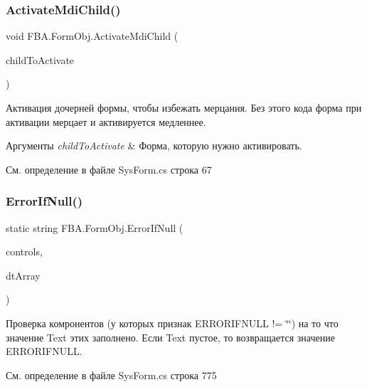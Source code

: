 \subsubsection{\texorpdfstring{Activate\+Mdi\+Child()}{ActivateMdiChild()}}
{\footnotesize\ttfamily void F\+B\+A.\+Form\+Obj.\+Activate\+Mdi\+Child (\begin{DoxyParamCaption}\item[{\mbox{\hyperlink{class_f_b_a_1_1_form_obj}{Form\+Obj}}}]{child\+To\+Activate }\end{DoxyParamCaption})}



Активация дочерней формы, чтобы избежать мерцания. Без этого кода форма при активации мерцает и активируется медленнее. 


\begin{DoxyParams}{Аргументы}
{\em child\+To\+Activate} & Форма, которую нужно активировать.\\
\hline
\end{DoxyParams}


См. определение в файле Sys\+Form.\+cs строка 67

\mbox{\label{class_f_b_a_1_1_form_obj_a206880e9e37a593cb85a5b2053320056}} 
\subsubsection{\texorpdfstring{Error\+If\+Null()}{ErrorIfNull()}}
{\footnotesize\ttfamily static string F\+B\+A.\+Form\+Obj.\+Error\+If\+Null (\begin{DoxyParamCaption}\item[{Control.\+Control\+Collection}]{controls,  }\item[{out \mbox{\hyperlink{_sys_static_8cs_a6542cfcff2f8e81f06ade15aa0bfe2b7}{System.\+Data.\+Data\+Table}}}]{dt\+Array }\end{DoxyParamCaption})\hspace{0.3cm}{\ttfamily [static]}}

Проверка комронентов (у которых признак E\+R\+R\+O\+R\+I\+F\+N\+U\+LL != \char`\"{}\char`\"{}) на то что значение Text этих заполнено. Если Text пустое, то возвращается значение E\+R\+R\+O\+R\+I\+F\+N\+U\+LL. 

См. определение в файле Sys\+Form.\+cs строка 775

